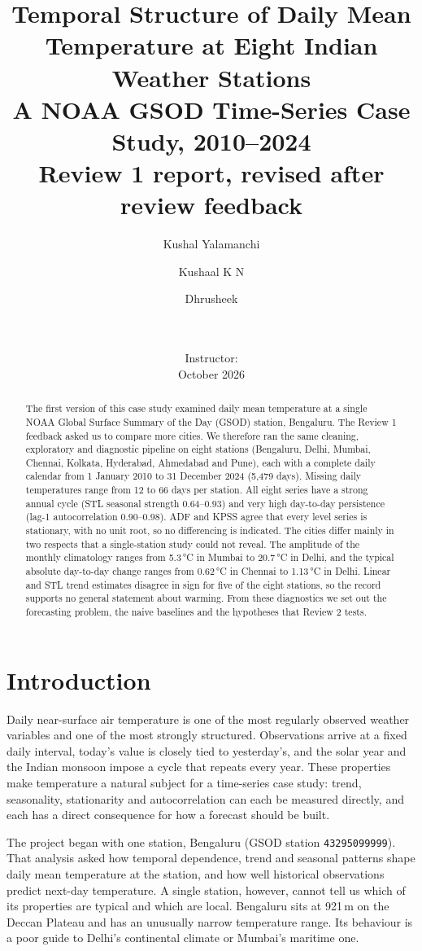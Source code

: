 \documentclass[11pt,a4paper]{article}
\title{\textbf{Temporal Structure of Daily Mean Temperature at Eight Indian Weather Stations}\\[4pt]
\large A NOAA GSOD Time-Series Case Study, 2010--2024\\[2pt]
\normalsize Review 1 report, revised after review feedback}
\author{Kushal Yalamanchi \and Kushaal K N \and Dhrusheek}
\date{%
  \ifx\CourseName\empty\else\CourseName\\\fi
  \ifx\Institution\empty\else\Institution\\\fi
  \ifx\Instructor\empty\else Instructor: \Instructor\\\fi
  October 2026}
\newcommand{\degC}{\,\si{\degreeCelsius}}
\newcommand{\code}[1]{\texttt{#1}}
\begin{document}
\maketitle
\thispagestyle{fancy}

\begin{abstract}
\noindent
The first version of this case study examined daily mean temperature at a single NOAA Global Surface Summary of the Day (GSOD) station, Bengaluru. The Review 1 feedback asked us to compare more cities. We therefore ran the same cleaning, exploratory and diagnostic pipeline on eight stations (Bengaluru, Delhi, Mumbai, Chennai, Kolkata, Hyderabad, Ahmedabad and Pune), each with a complete daily calendar from 1 January 2010 to 31 December 2024 (5{,}479 days). Missing daily temperatures range from 12 to 66 days per station. All eight series have a strong annual cycle (STL seasonal strength 0.64--0.93) and very high day-to-day persistence (lag-1 autocorrelation 0.90--0.98). ADF and KPSS agree that every level series is stationary, with no unit root, so no differencing is indicated. The cities differ mainly in two respects that a single-station study could not reveal. The amplitude of the monthly climatology ranges from 5.3\degC{} in Mumbai to 20.7\degC{} in Delhi, and the typical absolute day-to-day change ranges from 0.62\degC{} in Chennai to 1.13\degC{} in Delhi. Linear and STL trend estimates disagree in sign for five of the eight stations, so the record supports no general statement about warming. From these diagnostics we set out the forecasting problem, the naive baselines and the hypotheses that Review 2 tests.
\end{abstract}

\section{Introduction}
\label{sec:intro}

Daily near-surface air temperature is one of the most regularly observed weather variables and one of the most strongly structured. Observations arrive at a fixed daily interval, today's value is closely tied to yesterday's, and the solar year and the Indian monsoon impose a cycle that repeats every year. These properties make temperature a natural subject for a time-series case study: trend, seasonality, stationarity and autocorrelation can each be measured directly, and each has a direct consequence for how a forecast should be built.

The project began with one station, Bengaluru (GSOD station \code{43295099999}). That analysis asked how temporal dependence, trend and seasonal patterns shape daily mean temperature at the station, and how well historical observations predict next-day temperature. A single station, however, cannot tell us which of its properties are typical and which are local. Bengaluru sits at 921\,m on the Deccan Plateau and has an unusually narrow temperature range. Its behaviour is a poor guide to Delhi's continental climate or Mumbai's maritime one.
\end{document}

